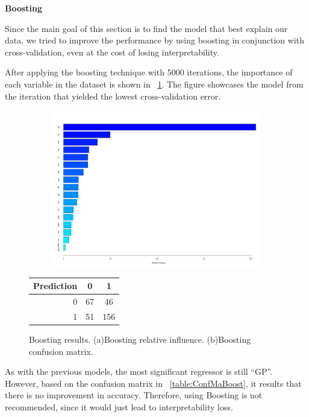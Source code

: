 \vspace{0.2cm}
\noindent
\textbf{Boosting}

Since the main goal of this section is to find the model that best explain our data, we tried to improve the performance by using boosting in conjunction with cross-validation, even at the cost of losing interpretability. 

After applying the boosting technique with 5000 iterations, the importance of each variable in the dataset is shown in \Fig~\ref{fig:boost_4_rel_inf}. The figure showcases the model from the iteration that yielded the lowest cross-validation error.

\begin{figure}[H]
	\centering
	\begin{subfigure}{0.5\textwidth}
		\centering
		\includegraphics[width=0.8\linewidth]{ImageFiles/Classification/Trees/boost_4_rel_inf_best.pdf}
		\caption{}
		\label{fig:boost_4_rel_inf}
	\end{subfigure}%
	\hfill
	\begin{subtable}{0.5\textwidth}
		\centering
		\begin{tabular}{|| cr | cc ||}    
			\hline
			\multicolumn{2}{|c|}{Prediction} 
			& 0 & 1 \\
			\hline
			& 0 & 67 & 46 \\
			& 1 & 51 & 156 \\
			\hline
		\end{tabular}
		\caption{}
		\label{table:ConfMaBoost}
	\end{subtable}
	\caption{Boosting results. (a)Boosting relative influence. (b)Boosting confusion matrix.}
	\label{BoostRes}
\end{figure}

As with the previous models, the most significant regressor is still ``GP''. However, based on the confusion matrix in \Tab~\ref{table:ConfMaBoost}, it results that there is no improvement in accuracy. Therefore, using Boosting is not recommended, since it would just lead to interpretability loss.

